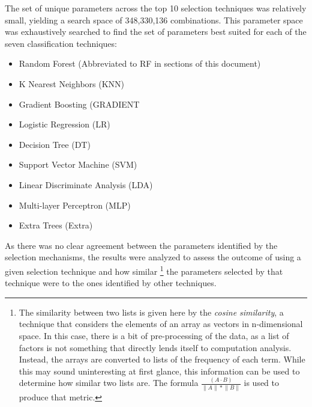\documentclass[letterpaper]{article}
\begin{document}
{The set of unique parameters across the top 10 selection techniques was relatively small, yielding a search space of 348,330,136 combinations. This parameter space was exhaustively searched to find the set of parameters best suited for each of the  seven classification techniques:
\begin{itemize}
	\item{Random Forest (Abbreviated to RF in sections of this document)}
	\item{K Nearest Neighbors (KNN)}
	\item{Gradient Boosting (GRADIENT}
	\item{Logistic Regression (LR)}
	\item{Decision Tree (DT)}
	\item{Support Vector Machine (SVM)}
	\item{Linear Discriminate Analysis (LDA)}
	\item{Multi-layer Perceptron (MLP)}
	\item{Extra Trees (Extra)}
\end{itemize}

As there was no clear agreement between the parameters identified by the selection mechanisms, the results were analyzed to assess the outcome of using a given selection technique and how similar 
\footnote{The similarity between two lists is given here by the \textit{cosine similarity}, a technique that considers the elements of an array as vectors in n-dimensional space. In this case, there is a bit of pre-processing of the data, as a list of factors is not something that directly lends itself to computation analysis. Instead, the arrays are converted to lists of the frequency of each term. While this may sound uninteresting at first glance, this information can be used to determine how similar two lists are. The formula $\frac {(A \cdot B)} { \lVert A \rVert * \lVert B \rVert }$ is used to produce that metric.}
the parameters selected by that technique were to the ones identified by other techniques. 

}
\end{document}
